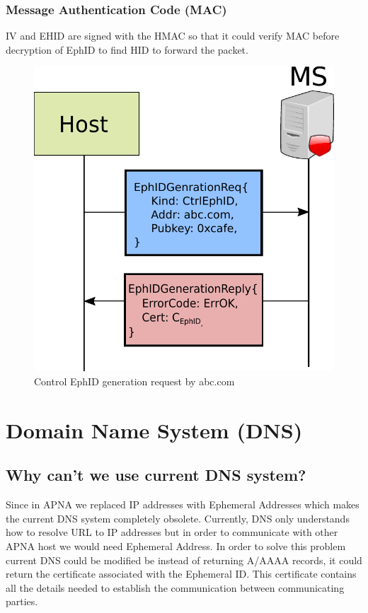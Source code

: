 \subsubsection{Message Authentication Code (MAC)}
IV and EHID are signed with the HMAC so that it could verify MAC before decryption of EphID to find HID to forward the packet.

\begin{figure}[th]
\centering
\includegraphics[scale=0.6]{Figures/ephid_gen.pdf}
\decoRule
\caption[EphID Generation Request]{Control EphID generation request by abc.com}
\label{fig:ephid_gen}
\end{figure}

\section{Domain Name System (DNS)}
\subsection{Why can't we use current DNS system?}
Since in APNA we replaced IP addresses with Ephemeral Addresses which makes the current DNS system completely obsolete. Currently, DNS only understands how to resolve URL to IP addresses but in order to communicate with other APNA host we would need Ephemeral Address. In order to solve this problem current DNS could be modified be instead of returning A/AAAA records, it could return the certificate associated with the Ephemeral ID. This certificate contains all the details needed to establish the communication between communicating parties.


